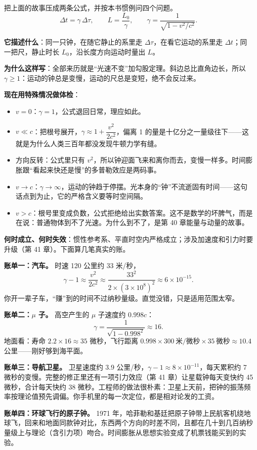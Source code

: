 \begin{mainline}
把上面的故事压成两条公式，并按本书惯例问四个问题。
\[
\Delta t=\gamma\,\Delta\tau,\qquad
L=\frac{L_0}{\gamma},\qquad
\gamma=\frac{1}{\sqrt{1-v^{2}/c^{2}}}.
\]

\textbf{它描述什么}：同一只钟，在随它静止的系里走 \(\Delta\tau\)，在看它运动的系里走 \(\Delta t\)；同一把尺，静止时长 \(L_0\)，沿长度方向运动时量出 \(L\)。

\textbf{为什么这样写}：全部来历就是“光速不变”加勾股定理。斜边总比直角边长，所以 \(\gamma\ge 1\)：运动的钟总是变慢，运动的尺总是变短，绝不会反过来。

\textbf{现在用特殊情况做体检}：
\begin{itemize}[leftmargin=1.6em]
  \item \(v=0\)：\(\gamma=1\)，公式退回日常，理应如此。
  \item \(v\ll c\)：把根号展开，\(\gamma\approx 1+\dfrac{v^{2}}{2c^{2}}\)，偏离 1 的量是十亿分之一量级往下——这就是为什么人类三百年都没发现牛顿力学有缝。
  \item 方向反转：公式里只有 \(v^{2}\)，所以钟迎面飞来和离你而去，变慢一样多。时间膨胀跟“看起来快还是慢”的多普勒效应是两码事。
  \item \(v\to c\)：\(\gamma\to\infty\)，运动的钟趋于停摆。光本身的“钟”不流逝固有时间——这句话点到为止，它的严格含义要等时空间隔。
  \item \(v>c\)：根号里变成负数，公式拒绝给出实数答案。这不是数学的坏脾气，而是在说：普通物体到不了光速。为什么到不了，是第 40 章能量与动量的故事。
\end{itemize}

\textbf{何时成立、何时失效}：惯性参考系、平直时空内严格成立；涉及加速度和引力时要升级（第 41 章）。下面算几笔真实的账。

\textbf{账单一：汽车。} 时速 120 公里约 33 米/秒，
\[
\gamma-1\approx\frac{v^{2}}{2c^{2}}\approx\frac{33^{2}}{2\times(3\times10^{8})^{2}}\approx 6\times10^{-15}.
\]
你开一辈子车，“赚”到的时间不过纳秒量级。直觉没错，只是适用范围太窄。

\textbf{账单二：\(\mu\) 子。} 高空产生的 \(\mu\) 子速度约 \(0.998c\)：
\[
\gamma=\frac{1}{\sqrt{1-0.998^{2}}}\approx 16.
\]
地面看：寿命 \(2.2\times16\approx 35\) 微秒，飞行距离 \(0.998\times300\ \text{米/微秒}\times35\ \text{微秒}\approx 10.4\) 公里——刚好够到海平面。

\textbf{账单三：导航卫星。} 卫星速度约 3.9 公里/秒，\(\gamma-1\approx 8\times10^{-11}\)，每天累积约 7 微秒的变慢。完整的修正里还有一项引力效应（第 41 章）让星载钟每天变快约 45 微秒，合计每天快约 38 微秒。工程师的做法很朴素：卫星上天前，把钟的振荡频率按理论值预先调偏。你手机里的每一次定位，都是相对论发的工资。

\textbf{账单四：环球飞行的原子钟。} 1971 年，哈菲勒和基廷把原子钟带上民航客机绕地球飞，回来和地面同款钟对比，东西两个方向的时差不同，且都在几十到几百纳秒量级上与理论（含引力项）吻合。时间膨胀从思想实验变成了机票钱能买到的实验。
\end{mainline}

